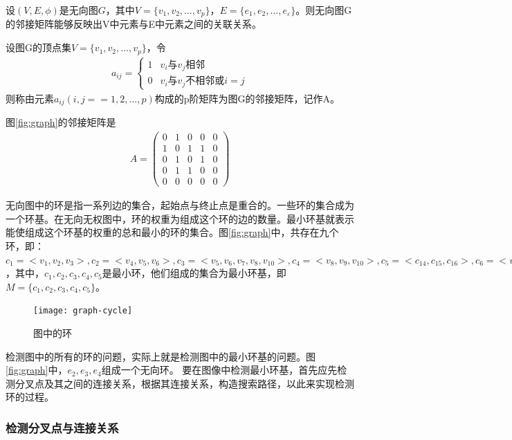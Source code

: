 设$(V, E, \phi)$是无向图$G$，其中$V = \{v_1, v_2, \ldots, v_p\}$，$E = \{e_1, e_2, \ldots, e_\varepsilon\}$。则无向图G的邻接矩阵能够反映出V中元素与E中元素之间的关联关系。
\begin{definition}
设图G的顶点集$V = \{v_1, v_2, \ldots, v_p\}$，令
\begin{align}
a_{ij} = \left\{ \begin{array}{ll}
1 & \textrm{$v_i$与$v_j$相邻}\\
0 & \textrm{$v_i$与$v_j$不相邻或$i = j$}
\end{array} \right.
\end{align}
则称由元素$a_{ij} (i, j == 1, 2, \ldots, p)$构成的p阶矩阵为图G的邻接矩阵\cite{wangzhaorui}，记作A。
\end{definition}
图\ref{fig:graph}的邻接矩阵是
\begin{align}
A = \left( \begin{array}{lllll}
0 & 1 & 0 & 0 & 0 \\
1 & 0 & 1 & 1 & 0 \\
0 & 1 & 0 & 1 & 0 \\
0 & 1 & 1 & 0 & 0 \\
0 & 0 & 0 & 0 & 0 
\end{array} \right)
\end{align}

无向图中的环是指一系列边的集合，起始点与终止点是重合的。一些环的集合成为一个环基。在无向无权图中，环的权重为组成这个环的边的数量。最小环基就表示能使组成这个环基的权重的总和最小的环的集合。图\ref{fig:graph}中，共存在九个环，即：$c_1 = < v_1, v_2, v_3>, c_2 = <v_4, v_5, v_6>, c_3 = <v_5, v_6, v_7, v_8, v_10>, c_4 = <v_8, v_9, v_10>, c_5 = < c_14, c_15, c_16>, c_6 = <v_10, v_11, v_12, v_13>, c_7 = <c_4, c_5, v_10, v_10, v_8, v_7, v_6>, c_8 = < v_6, v_5, v_10, v_9, v_8, v_7>, v_9 = < v_4, v_5, v_10, v_9, v_8, v_7, v_6>$，其中，$c_1, c_2, c_3, c_4, c_5$是最小环，他们组成的集合为最小环基，即$M = \{c_1, c_2, c_3, c_4, c_5\}$。
\begin{figure}
\centering
    \centering
    \texttt{[image: graph-cycle]}\medskip
\caption{图中的环}
\label{fig:graph-cycle}
\end{figure}


检测图中的所有的环的问题，实际上就是检测图中的最小环基的问题。图\ref{fig:graph}中，$e_2, e_3, e_4$组成一个无向环。
要在图像中检测最小环基，首先应先检测分叉点及其之间的连接关系，根据其连接关系，构造搜索路径，以此来实现检测环的过程。

\subsubsection{检测分叉点与连接关系}
\label{}

